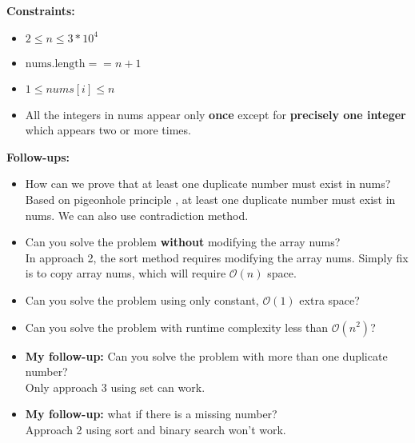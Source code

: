 \documentclass[justified]{tufte-book}
\begin{document}
\noindent \textbf{Constraints:}
\begin{itemize}
    \item $2 \leq n \leq 3*10^4$
    \item $\text{nums.length} == n + 1$
    \item $1 \leq nums[i] \leq n$
    \item All the integers in nums appear only \textbf{once} except for \textbf{precisely one integer} which appears two or more times.
\end{itemize} 

\noindent \textbf{Follow-ups:}
\begin{itemize}
    \item How can we prove that at least one duplicate number must exist in nums?\\
    Based on pigeonhole principle , at least one duplicate number must exist in nums. We can also use contradiction method. 
    \item Can you solve the problem \textbf{without} modifying the array nums? \\
    In approach 2, the sort method requires modifying the array nums. Simply fix is to copy array nums, which will require $\mathcal{O}(n)$ space. 
    \item Can you solve the problem using only constant, $\mathcal{O}(1)$ extra space?
    \item Can you solve the problem with runtime complexity less than $\mathcal{O}(n^2)$?
    \item \textbf{My follow-up:} Can you solve the problem with more than one duplicate number? \\
    Only approach 3 using set can work. 
    \item \textbf{My follow-up:} what if there is a missing number? \\
    Approach 2 using sort and binary search won't work.
\end{itemize}
\end{document}
